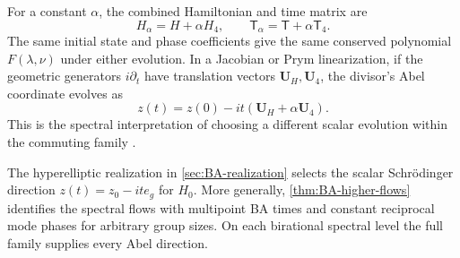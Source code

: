 For a constant $\alpha$, the combined Hamiltonian and time matrix are
\begin{equation}\label{eq:hierarchy-combination}
 H_\alpha=H+\alpha H_4,\qquad
 \mathsf T_\alpha=\mathsf T+\alpha\mathsf T_4.
\end{equation}
The same initial state and phase coefficients give the same
conserved polynomial $F(\lambda,\nu)$ under either evolution.
In a Jacobian or Prym linearization, if the geometric generators $i\partial_t$ have translation
vectors $\boldsymbol U_H,\boldsymbol U_4$, the divisor's Abel
coordinate evolves as
\begin{equation}\label{eq:hierarchy-direction}
 z(t)=z(0)-it(\boldsymbol U_H+\alpha\boldsymbol U_4).
\end{equation}
This is the spectral interpretation of choosing a different scalar
evolution within the commuting family
\cite{Beauville1990,Vanhaecke2001}.

The hyperelliptic realization in \cref{sec:BA-realization} selects
the scalar Schr\"odinger direction $z(t)=z_0-it e_g$ for $H_0$.
More generally, \cref{thm:BA-higher-flows} identifies the spectral
flows with multipoint BA times and constant reciprocal mode phases
for arbitrary group sizes. On each birational spectral level the
full family supplies every Abel direction.
